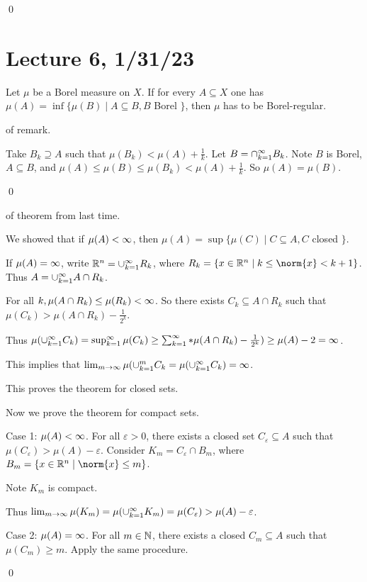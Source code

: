 \documentclass[x11names,reqno,14pt]{extarticle}
\newcommand{\seq}[2][\oo]{_{#2 = 1}^#1}
\newcommand{\cupk}[1][\oo]{\cup\seq[#1]{k}}
\newcommand{\capk}[1][\oo]{\cap\seq[#1]{k}}
\begin{document}
\qed

\section*{Lecture 6, 1/31/23}

\rem 

Let $\mu$ be a Borel measure on $X$. If for every $A \subseteq X$ one has $\mu(A) = \inf\{\mu(B) \mid A \subseteq B, B$ Borel $\}$, then $\mu$ has to be Borel-regular. 

\proof of remark. 

Take $B_k\supseteq A$ such that $\mu(B_k) < \mu(A) + \frac{1}{k}$. Let $B = \capk B_k$. Note $B$ is Borel, $A \subseteq B$, and $\mu(A)\leq\mu(B)\leq\mu(B_k)<\mu(A) + \frac{1}{k}$. So $\mu(A) = \mu(B)$. 

\qed 

\proof of theorem from last time. 

We showed that if $\mu(A)<\infty$, then $\mu(A) = \sup\{\mu(C)\mid C \subseteq A, C$ closed $\}$. 

If $\mu(A) = \infty$, write $\R^n = \cupk R_k$, where $R_k = \{x\in\R^n\mid k \leq \norm{x} < k + 1\}$. Thus $A = \cupk A \cap R_k$. 

For all $k, \mu(A\cap R_k) \leq \mu(R_k) < \infty$. So there exists $C_k \subseteq A\cap R_k$ such that $\mu(C_k) > \mu(A\cap R_k) - \frac{1}{2^k}$. 

Thus $\mu(\cupk C_k) = \sup\seq{k}\mu(C_k) \geq \sum\seq{k}*\mu(A\cap R_k) - \frac{1}{2^k}) \geq \mu(A) - 2 = \oo$. 

This implies that $\lim_{m\to\oo}\mu(\cupk[m]C_k = \mu(\cupk C_k) = \oo$. 

This proves the theorem for closed sets. 

Now we prove the theorem for compact sets. 

Case 1: $\mu(A)<\infty$. For all $\varepsilon > 0$, there exists a closed set $C_\varepsilon\subseteq A$ such that $\mu(C_\varepsilon) > \mu(A) - \varepsilon$. Consider $K_m = C_\varepsilon\cap B_m$, where $B_m = \{x\in\R^n \mid \norm{x}\leq m\}$. 

Note $K_m$ is compact. 

Thus $\lim_{m\to\oo}\mu(K_m) = \mu(\cupk K_m) = \mu(C_\varepsilon) > \mu(A) - \varepsilon$. 

Case 2: $\mu(A) = \infty$. For all $m \in \mathbb{N}$, there exists a closed $C_m\subseteq A$ such that $\mu(C_m)\geq m$. Apply the same procedure. 

\qed
\end{document}
